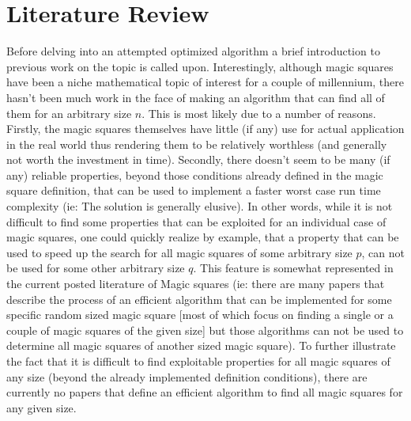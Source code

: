 \documentclass{article}
\begin{document}
\section{Literature Review}
    Before delving into an attempted optimized algorithm a brief introduction to previous work on the topic is called upon. Interestingly, although magic squares have been a niche mathematical topic of interest for a couple of millennium, there hasn't been much work in the face of making an algorithm that can find all of them for an arbitrary size $n$. This is most likely due to a number of reasons. Firstly, the magic squares themselves have little (if any) use for actual application in the real world thus rendering them to be relatively worthless (and generally not worth the investment in time). Secondly, there doesn't seem to be many (if any) reliable properties, beyond those conditions already defined in the magic square definition, that can be used to implement a faster worst case run time complexity (ie: The solution is generally elusive). In other words, while it is not difficult to find some properties that can be exploited for an individual case of magic squares, one could quickly realize by example, that a property that can be used to speed up the search for all magic squares of some arbitrary size $p$, can not be used for some other arbitrary size $q$. This feature is somewhat represented in the current posted literature of Magic squares (ie: there are many papers that describe the process of an efficient algorithm that can be implemented for some specific random sized magic square [most of which focus on finding a single or a couple of magic squares of the given size] but those algorithms can not be used to determine all magic squares of another sized magic square). To further illustrate the fact that it is difficult to find exploitable properties for all magic squares of any size (beyond the already implemented definition conditions), there are currently no papers that define an efficient algorithm to find all magic squares for any given size.  
    
\end{document}
